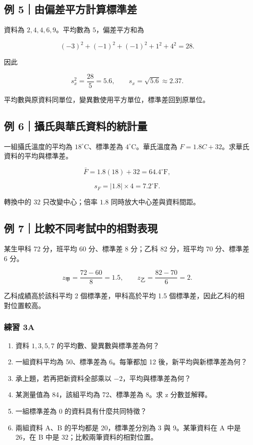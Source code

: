 \documentclass[11pt,a4paper]{article}
\providecommand{\tightlist}{%
  \setlength{\itemsep}{0pt}\setlength{\parskip}{0pt}}
\begin{document}
\subsection{例 5｜由偏差平方計算標準差}\label{ux4f8b-5ux7531ux504fux5deeux5e73ux65b9ux8a08ux7b97ux6a19ux6e96ux5dee}

資料為 \(2,4,4,6,9\)。平均數為 \(5\)，偏差平方和為

\[
(-3)^2+(-1)^2+(-1)^2+1^2+4^2=28.
\]

因此

\[
s_x^2=\frac{28}{5}=5.6,\qquad
s_x=\sqrt{5.6}\approx\boxed{2.37}.
\]

平均數與原資料同單位，變異數使用平方單位，標準差回到原單位。

\subsection{例 6｜攝氏與華氏資料的統計量}\label{ux4f8b-6ux651dux6c0fux8207ux83efux6c0fux8cc7ux6599ux7684ux7d71ux8a08ux91cf}

一組攝氏溫度的平均為 \(18^\circ\mathrm C\)、標準差為 \(4^\circ\mathrm C\)。華氏溫度為 \(F=1.8C+32\)。求華氏資料的平均與標準差。

\[
\bar F=1.8(18)+32=\boxed{64.4^\circ\mathrm F},
\]

\[
s_F=|1.8|\times4=\boxed{7.2^\circ\mathrm F}.
\]

轉換中的 \(32\) 只改變中心；倍率 \(1.8\) 同時放大中心差與資料間距。

\subsection{例 7｜比較不同考試中的相對表現}\label{ux4f8b-7ux6bd4ux8f03ux4e0dux540cux8003ux8a66ux4e2dux7684ux76f8ux5c0dux8868ux73fe}

某生甲科 72 分，班平均 60 分、標準差 8 分；乙科 82 分，班平均 70 分、標準差 6 分。

\[
z_{\text{甲}}=\frac{72-60}{8}=1.5,
\qquad
z_{\text{乙}}=\frac{82-70}{6}=2.
\]

乙科成績高於該科平均 2 個標準差，甲科高於平均 1.5 個標準差，因此乙科的相對位置較高。

\subsubsection{練習 3A}\label{ux7df4ux7fd2-3a}

\begin{enumerate}
\def\labelenumi{\arabic{enumi}.}
\tightlist
\item
  資料 \(1,3,5,7\) 的平均數、變異數與標準差為何？
\item
  一組資料平均為 50、標準差為 6。每筆都加 12 後，新平均與新標準差為何？
\item
  承上題，若再把新資料全部乘以 \(-2\)，平均與標準差為何？
\item
  某測量值為 84，該組平均為 72、標準差為 8。求 z 分數並解釋。
\item
  一組標準差為 0 的資料具有什麼共同特徵？
\item
  兩組資料 A、B 的平均都是 20，標準差分別為 3 與 9。某筆資料在 A 中是 26，在 B 中是 32；比較兩筆資料的相對位置。
\end{enumerate}
\end{document}
